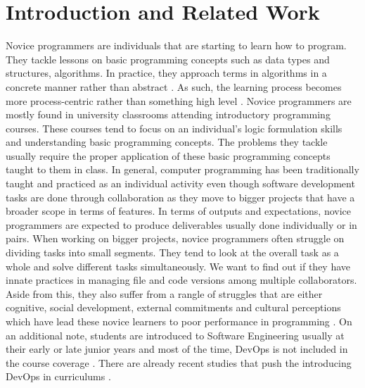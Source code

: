 \documentclass{sigchi}
\begin{document}
\section{Introduction and Related Work}
Novice programmers are individuals that are starting to learn how to program. They tackle lessons on basic programming concepts such as data types and structures, algorithms. In practice, they approach terms in algorithms in a concrete manner rather than abstract \cite{mccarthygame}. As such, the learning process becomes more process-centric rather than something high level \cite{teague2014longitudinal}. Novice programmers are mostly found in university classrooms attending introductory programming courses. These courses tend to focus on an individual's logic formulation skills and understanding basic programming concepts. The problems they tackle usually require the proper application of these basic programming concepts taught to them in class. In general, computer programming has been traditionally taught and practiced as an individual activity even though software development tasks are done through collaboration \cite{mcdowell2002effects} as they move to bigger projects that have a broader scope in terms of features. 
In terms of outputs and expectations, novice programmers are expected to produce deliverables usually done individually or in pairs. When working on bigger projects, novice programmers often struggle on dividing tasks into small segments. They tend to look at the overall task as a whole and solve different tasks simultaneously. We want to find out if they have innate practices in managing file and code versions among multiple collaborators. Aside from this, they also suffer from a rangle of struggles that are either cognitive, social development, external commitments and cultural perceptions which have lead these novice learners to poor performance in programming \cite{teague2008collaborative}. On an additional note, students are introduced to Software Engineering usually at their early or late junior years and most of the time, DevOps is not included in the course coverage \cite{bass2016software}. There are already recent studies that push the introducing DevOps in curriculums \cite{bruel2019software, jones2018proposal}.
\end{document}
